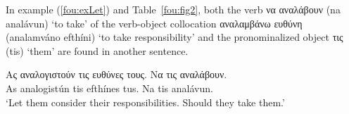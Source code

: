 \documentclass[output=paper]{langsci/langscibook}
\begin{document}
In example (\ref{fou:exLet}) %
and Table~\ref{fou:fig2}, both the verb {να αναλάβουν} (na analávun) `to take' of the verb-object collocation {αναλαμβάνω ευθύνη} (analamváno efthíni) `to take responsibility' and the pronominalized object {τις} (tis) `them' are found in another sentence.

\ea\label{fou:exLet}
\gll Ας αναλογιστούν τις ευθύνες τους. Να τις αναλάβουν. \\
As analogistún tis efthínes tus. Na tis analávun. \\
\glt `Let them consider their responsibilities. Should they take them.'
\z

\begin{table}[h]
 \caption{\label{fou:fig2}Identification of a verbal collocation}
\end{table} 
\end{document}

